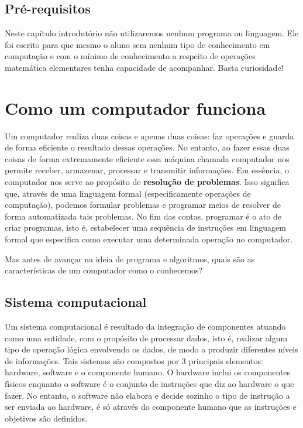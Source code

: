 \documentclass[
  brazilian,
  letterpaper,
  DIV=11,
  numbers=noendperiod]{scrreprt}
\begin{document}
\subsection{Pré-requisitos}\label{pruxe9-requisitos}

Neste capítulo introdutório não utilizaremos nenhum programa ou
linguagem. Ele foi escrito para que mesmo o aluno sem nenhum tipo de
conhecimento em computação e com o mínimo de conhecimento a respeito de
operações matemática elementares tenha capacidade de acompanhar. Basta
curiosidade!

\section{Como um computador funciona}\label{como-um-computador-funciona}

Um computador realiza duas coisas e apenas duas coisas: faz operações e
guarda de forma eficiente o resultado dessas operações. No entanto, ao
fazer essas duas coisas de forma extremamente eficiente essa máquina
chamada computador nos permite receber, armazenar, processar e
transmitir informações. Em essência, o computador nos serve ao propósito
de \textbf{resolução de problemas}. Isso significa que, através de uma
linguagem formal (especificamente operações de computação), podemos
formular problemas e programar meios de resolver de forma automatizada
tais problemas. No fim das contas, programar é o ato de criar programas,
isto é, estabelecer uma sequência de instruções em linguagem formal que
especifica como executar uma determinada operação no computador.

Mas antes de avançar na ideia de programa e algoritmos, quais são as
características de um computador como o conhecemos?

\subsection{Sistema computacional}\label{sistema-computacional}

Um sistema computacional é resultado da integração de componentes
atuando como uma entidade, com o propósito de processar dados, isto é,
realizar algum tipo de operação lógica envolvendo os dados, de modo a
produzir diferentes níveis de informações. Tais sistemas são compostos
por 3 principais elementos: hardware, software e o componente humano. O
hardware inclui os componentes físicos enquanto o software é o conjunto
de instruções que diz ao hardware o que fazer. No entanto, o software
não elabora e decide sozinho o tipo de instrução a ser enviada ao
hardware, é só através do componente humano que as instruções e
objetivos são definidos.
\end{document}
